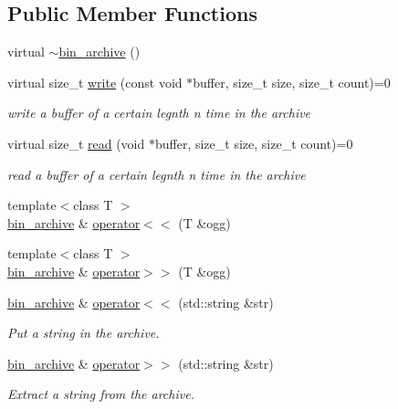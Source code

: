 \subsection*{Public Member Functions}
\begin{DoxyCompactItemize}
\item 
virtual \hyperlink{classeternity_1_1bin__archive_a0cc44edd050d598ff4f617e445159386}{$\sim$bin\+\_\+archive} ()
\item 
virtual size\+\_\+t \hyperlink{classeternity_1_1bin__archive_acbe041b0815f2721ee18ad042557b14e}{write} (const void $\ast$buffer, size\+\_\+t size, size\+\_\+t count)=0
\begin{DoxyCompactList}\small\item\em write a buffer of a certain legnth n time in the archive \end{DoxyCompactList}\item 
virtual size\+\_\+t \hyperlink{classeternity_1_1bin__archive_a5d67b032541f5a1e104d2fcd0eaa7a55}{read} (void $\ast$buffer, size\+\_\+t size, size\+\_\+t count)=0
\begin{DoxyCompactList}\small\item\em read a buffer of a certain legnth n time in the archive \end{DoxyCompactList}\item 
{\footnotesize template$<$class T $>$ }\\\hyperlink{classeternity_1_1bin__archive}{bin\+\_\+archive} \& \hyperlink{classeternity_1_1bin__archive_a451f9bd713b83922890014af88d386e6}{operator$<$$<$} (T \&ogg)
\item 
{\footnotesize template$<$class T $>$ }\\\hyperlink{classeternity_1_1bin__archive}{bin\+\_\+archive} \& \hyperlink{classeternity_1_1bin__archive_a8c431d394555d953019fe1f35ca77ffd}{operator$>$$>$} (T \&ogg)
\item 
\hyperlink{classeternity_1_1bin__archive}{bin\+\_\+archive} \& \hyperlink{classeternity_1_1bin__archive_a5cc61f7f70b1d809fbece79ccb9ecb26}{operator$<$$<$} (std\+::string \&str)
\begin{DoxyCompactList}\small\item\em Put a string in the archive. \end{DoxyCompactList}\item 
\hyperlink{classeternity_1_1bin__archive}{bin\+\_\+archive} \& \hyperlink{classeternity_1_1bin__archive_a4cbbd8dff6b78cf3868a49b30261dd26}{operator$>$$>$} (std\+::string \&str)
\begin{DoxyCompactList}\small\item\em Extract a string from the archive. \end{DoxyCompactList}\item 

\end{DoxyCompactItemize}
